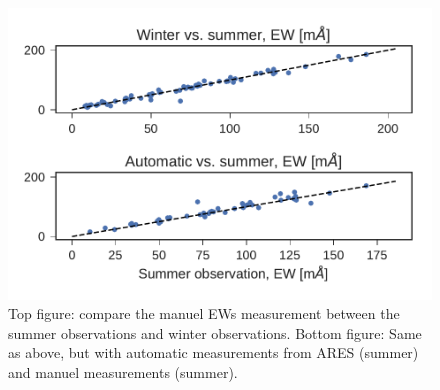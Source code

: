 \documentclass{aa}
\begin{document}
\begin{figure}[tpb]
    \centering
    \includegraphics[width=1.0\linewidth]{figures/EWcomp.pdf}
    \caption{Top figure: compare the manuel EWs measurement between the summer
             observations and winter observations. Bottom figure: Same as above,
             but with automatic measurements from ARES (summer) and manuel
             measurements (summer).}
    \label{fig:EWcomp}
\end{figure}
\end{document}
